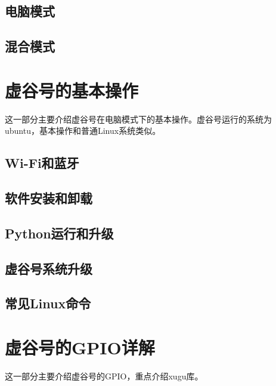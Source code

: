 \documentclass[letterpaper,10pt,english]{sphinxmanual}
\begin{document}
\section{电脑模式}
\label{\detokenize{02.quick/2.3-pc:id1}}\label{\detokenize{02.quick/2.3-pc::doc}}

\section{混合模式}
\label{\detokenize{02.quick/2.4-blend:id1}}\label{\detokenize{02.quick/2.4-blend::doc}}

\chapter{虚谷号的基本操作}
\label{\detokenize{03.basic/index:id1}}\label{\detokenize{03.basic/index::doc}}
这一部分主要介绍虚谷号在电脑模式下的基本操作。虚谷号运行的系统为ubuntu，基本操作和普通Linux系统类似。


\section{Wi-Fi和蓝牙}
\label{\detokenize{03.basic/3.1:wi-fi}}\label{\detokenize{03.basic/3.1::doc}}

\section{软件安装和卸载}
\label{\detokenize{03.basic/3.2:id1}}\label{\detokenize{03.basic/3.2::doc}}

\section{Python运行和升级}
\label{\detokenize{03.basic/3.3:python}}\label{\detokenize{03.basic/3.3::doc}}

\section{虚谷号系统升级}
\label{\detokenize{03.basic/3.4:id1}}\label{\detokenize{03.basic/3.4::doc}}

\section{常见Linux命令}
\label{\detokenize{03.basic/3.5:linux}}\label{\detokenize{03.basic/3.5::doc}}

\chapter{虚谷号的GPIO详解}
\label{\detokenize{04.gpio/index:gpio}}\label{\detokenize{04.gpio/index::doc}}
这一部分主要介绍虚谷号的GPIO，重点介绍xugu库。
\end{document}
